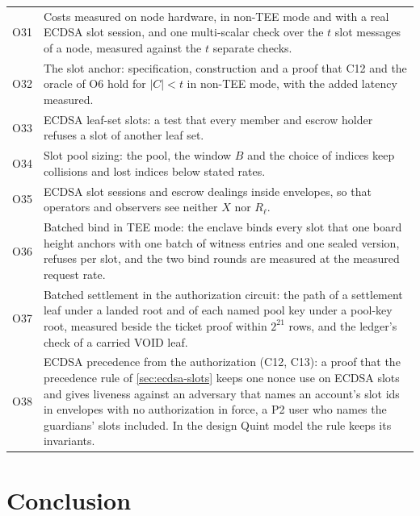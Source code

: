 {\begin{longtable}{@{}>{\raggedright\arraybackslash}p{0.8cm}>{\raggedright\arraybackslash}p{13.5cm}@{}}
O31 & Costs measured on node hardware, in non-TEE mode and with a real ECDSA slot session, and one multi-scalar check over the $t$ slot messages of a node, measured against the $t$ separate checks. \\
O32 & The slot anchor: specification, construction and a proof that C12 and the oracle of O6 hold for $|C| < t$ in non-TEE mode, with the added latency measured. \\
O33 & ECDSA leaf-set slots: a test that every member and escrow holder refuses a slot of another leaf set. \\
O34 & Slot pool sizing: the pool, the window $B$ and the choice of indices keep collisions and lost indices below stated rates. \\
O35 & ECDSA slot sessions and escrow dealings inside envelopes, so that operators and observers see neither $X$ nor $R_\ell$. \\
O36 & Batched bind in TEE mode: the enclave binds every slot that one board height anchors with one batch of witness entries and one sealed version, refuses per slot, and the two bind rounds are measured at the measured request rate. \\
O37 & Batched settlement in the authorization circuit: the path of a settlement leaf under a landed root and of each named pool key under a pool-key root, measured beside the ticket proof within $2^{21}$ rows, and the ledger's check of a carried VOID leaf. \\
O38 & ECDSA precedence from the authorization (C12, C13): a proof that the precedence rule of \cref{sec:ecdsa-slots} keeps one nonce use on ECDSA slots and gives liveness against an adversary that names an account's slot ids in envelopes with no authorization in force, a P2 user who names the guardians' slots included. In the design Quint model the rule keeps its invariants. \\
\end{longtable}
}

\section{Conclusion}\label{sec:conclusion}

